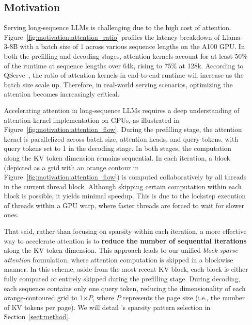 \subsection{Motivation}
\label{sect:motivation}



Serving long-sequence LLMs is challenging due to the high cost of attention. Figure~\ref{fig:motivation:attention_ratio} profiles the latency breakdown of Llama-3-8B with a batch size of 1 across various sequence lengths on the A100 GPU. In both the prefilling and decoding stages, attention kernels account for at least 50\% of the runtime at sequence lengths over 64k, rising to 75\% at 128k. According to QServe~\cite{lin2024qserve}, the ratio of attention kernels in end-to-end runtime will increase as the batch size scale up. Therefore, in real-world serving scenarios, optimizing the attention becomes increasingly critical. 

Accelerating attention in long-sequence LLMs requires a deep understanding of attention kernel implementation on GPUs, as illustrated in Figure~\ref{fig:motivation:attention_flow}. During the prefilling stage, the attention kernel is parallelized across batch size, attention heads, and query tokens, with query tokens set to 1 in the decoding stage. In both stages, the computation along the KV token dimension remains sequential. In each iteration, a block (depicted as a grid with an orange contour in Figure~\ref{fig:motivation:attention_flow}) is computed collaboratively by all threads in the current thread block. Although skipping certain computation within each block is possible, it yields minimal speedup. This is due to the lockstep execution of threads within a GPU warp, where faster threads are forced to wait for slower ones. 

That said, rather than focusing on sparsity within each iteration, a more effective way to accelerate attention is to \textbf{reduce the number of sequential iterations} along the KV token dimension. This approach leads to our unified \textit{block sparse attention} formulation, where attention computation is skipped in a blockwise manner. In this scheme, aside from the most recent KV block, each block is either fully computed or entirely skipped during the prefilling stage. During decoding, each sequence contains only one query token, reducing the dimensionality of each orange-contoured grid to 1$\times P$, where $P$ represents the page size (i.e., the number of KV tokens per page). We will detail \system's sparsity pattern selection in Section~\ref{sect:method}. 

